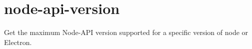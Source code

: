 \chapter{node-\/api-\/version}
\hypertarget{md__2_users_2hello_2_documents_2_git_hub_2finalproject-engine-drop-table-engines_2_engine_2src_28bdcaa293157691a6198158c204d1e13}{}\label{md__2_users_2hello_2_documents_2_git_hub_2finalproject-engine-drop-table-engines_2_engine_2src_28bdcaa293157691a6198158c204d1e13}
\label{md__2_users_2hello_2_documents_2_git_hub_2finalproject-engine-drop-table-engines_2_engine_2src_28bdcaa293157691a6198158c204d1e13_autotoc_md8102}%
%


Get the maximum Node-\/\+API version supported for a specific version of node or Electron.


\begin{DoxyCode}{0}
\DoxyCodeLine{}
\DoxyCodeLine{}

\end{DoxyCode}
 